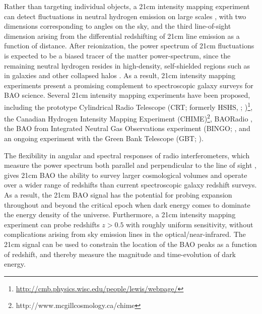 \documentclass[10pt,iop]{emulateapj}
\begin{document}
Rather than targeting individual objects, a 21cm intensity mapping
experiment can detect fluctuations in neutral hydrogen emission on large scales
\citep{chang_et_al_2008,wyithe_et_al_2008,morales_and_wyithe_2010,pritchard_and_loeb_2011},
with two dimensions corresponding to angles
on the sky, and the third line-of-sight dimension arising from the differential 
redshifting of 21cm line emission as a function of distance.
After reionization, the power spectrum of 21cm fluctuations is expected to be a biased tracer of the matter power-spectrum,
since the remaining neutral hydrogen resides in
high-density, self-shielded regions such as in galaxies and other collapsed halos
\citep{barkana_and_loeb_2007,madau_et_al_1997}.  As a result, 
21cm intensity mapping experiments
present a promising complement to spectroscopic galaxy surveys
for BAO science.  Several 21cm intensity mapping experiments have been proposed,
including the prototype Cylindrical Radio Telescope (CRT; formerly HSHS, 
\citealt{peterson_et_al_2006}; \citealt{seo_et_al_2010})\footnote{\url{http://cmb.physics.wisc.edu/people/lewis/webpage/}},
the Canadian Hydrogen Intensity Mapping Experiment (CHIME)\footnote{http://www.mcgillcosmology.ca/chime},
BAORadio \citep{ansari_et_al_2012a,ansari_et_al_2012b}, 
the BAO from Integrated Neutral Gas Observations experiment (BINGO; \citealt{battye_et_al_2012},
and an ongoing experiment with the Green Bank
Telescope (GBT; \citealt{chang_et_al_2010}).  

The flexibility in angular and spectral responses of radio interferometers,
which measure the power spectrum both parallel and perpendicular to
the line of sight \citep{morales_2005},
gives 21cm BAO the ability to survey larger cosmological volumes and operate over
a wider range of redshifts than current spectroscopic galaxy redshift surveys.
As a result, the 21cm BAO signal has the potential for probing expansion throughout
and beyond
the critical epoch when dark energy comes to dominate the energy density of the
universe.
Furthermore, a 21cm intensity mapping experiment can probe redshifts $z > 0.5$ 
with roughly uniform sensitivity,
without complications arising from sky emission lines in the optical/near-infrared.
The 21cm signal can be used to constrain the location of the
BAO peaks as a function of redshift, and thereby measure
the magnitude and time-evolution of dark energy.
\end{document}
